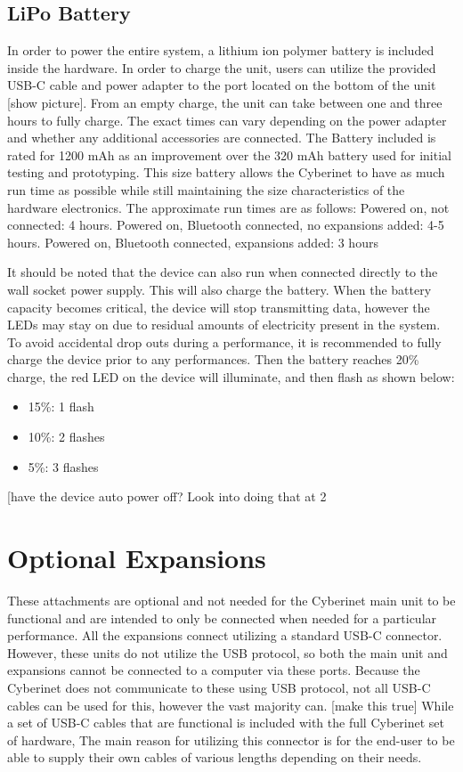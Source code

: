 \section{LiPo Battery}
In order to power the entire system, a lithium ion polymer battery is included inside the hardware. In order to charge the unit, users can utilize the provided USB-C cable and power adapter to the port located on the bottom of the unit [show picture]. From an empty charge, the unit can take between one and three hours to fully charge. The exact times can vary depending on the power adapter and whether any additional accessories are connected. 
The Battery included is rated for 1200 mAh as an improvement over the 320 mAh battery used for initial testing and prototyping. This size battery allows the Cyberinet to have as much run time as possible while still maintaining the size characteristics of the hardware electronics. The approximate run times are as follows:
Powered on, not connected: 4 hours.
Powered on, Bluetooth connected, no expansions added: 4-5 hours.
Powered on, Bluetooth connected, expansions added: 3 hours

It should be noted that the device can also run when connected directly to the wall socket power supply. This will also charge the battery. 
When the battery capacity becomes critical, the device will stop transmitting data, however the LEDs may stay on due to residual amounts of electricity present in the system. To avoid accidental drop outs during a performance, it is recommended to fully charge the device prior to any performances. Then the battery reaches 20\% charge, the red LED on the device will illuminate, and then flash as shown below:
\begin{itemize}
    \item 15\%: 1 flash
    \item 10\%: 2 flashes
    \item 5\%: 3 flashes
\end{itemize}

[have the device auto power off? Look into doing that at 2%


\chapter{Optional Expansions}
These attachments are optional and not needed for the Cyberinet main unit to be functional and are intended to only be connected when needed for a particular performance. All the expansions connect utilizing a standard USB-C connector. However, these units do not utilize the USB protocol, so both the main unit and expansions cannot be connected to a computer via these ports. Because the Cyberinet does not communicate to these using USB protocol, not all USB-C cables can be used for this, however the vast majority can. [make this true] While a set of USB-C cables that are functional is included with the full Cyberinet set of hardware, The main reason for utilizing this connector is for the end-user to be able to supply their own cables of various lengths depending on their needs. 

